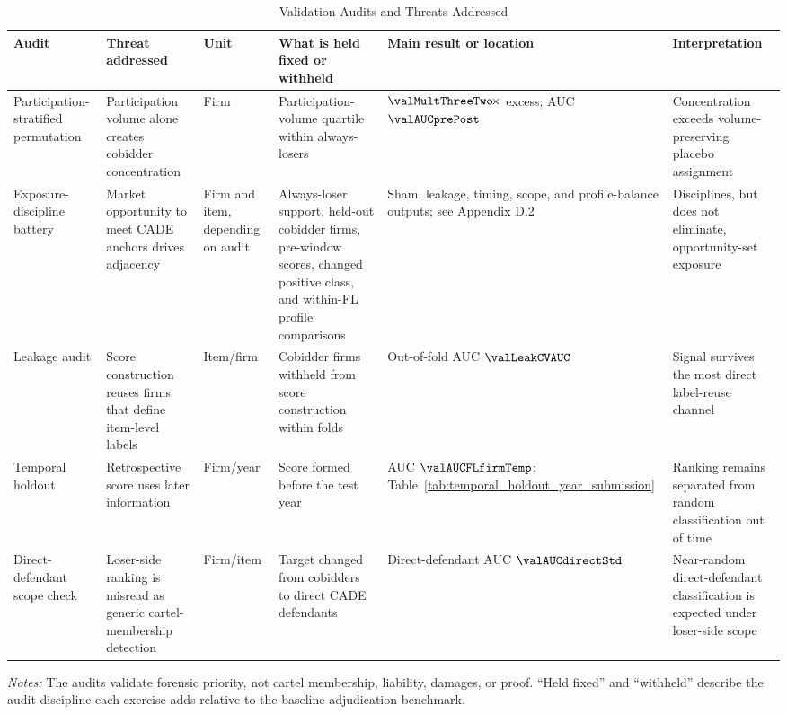 \begin{table}[htbp]
\centering
\caption{Validation Audits and Threats Addressed}
\label{tab:validation_audit_map_submission}
\footnotesize
\begin{adjustbox}{max width=\textwidth,center}
\begin{threeparttable}
\begin{tabular}{L{3.2cm}L{3.7cm}L{2.4cm}L{3.8cm}L{3.2cm}L{3.7cm}}
\toprule
Audit & Threat addressed & Unit & What is held fixed or withheld & Main result or location & Interpretation \\
\midrule
Participation-stratified permutation &
Participation volume alone creates cobidder concentration &
Firm &
Participation-volume quartile within always-losers &
$\valMultThreeTwo\!\times$ excess; AUC $\valAUCprePost$ &
Concentration exceeds volume-preserving placebo assignment \\
Exposure-discipline battery &
Market opportunity to meet CADE anchors drives adjacency &
Firm and item, depending on audit &
Always-loser support, held-out cobidder firms, pre-window scores, changed positive class, and within-FL profile comparisons &
Sham, leakage, timing, scope, and profile-balance outputs; see Appendix D.2 &
Disciplines, but does not eliminate, opportunity-set exposure \\
Leakage audit &
Score construction reuses firms that define item-level labels &
Item/firm &
Cobidder firms withheld from score construction within folds &
Out-of-fold AUC $\valLeakCVAUC$ &
Signal survives the most direct label-reuse channel \\
Temporal holdout &
Retrospective score uses later information &
Firm/year &
Score formed before the test year &
AUC $\valAUCFLfirmTemp$; Table~\ref{tab:temporal_holdout_year_submission} &
Ranking remains separated from random classification out of time \\
Direct-defendant scope check &
Loser-side ranking is misread as generic cartel-membership detection &
Firm/item &
Target changed from cobidders to direct CADE defendants &
Direct-defendant AUC $\valAUCdirectStd$ &
Near-random direct-defendant classification is expected under loser-side scope \\
\bottomrule
\end{tabular}
\begin{tablenotes}
\footnotesize
\item \textit{Notes:} The audits validate forensic priority, not
cartel membership, liability, damages, or proof. ``Held fixed''
and ``withheld'' describe the audit discipline each exercise
adds relative to the baseline adjudication benchmark.
\end{tablenotes}
\end{threeparttable}
\end{adjustbox}
\end{table}

